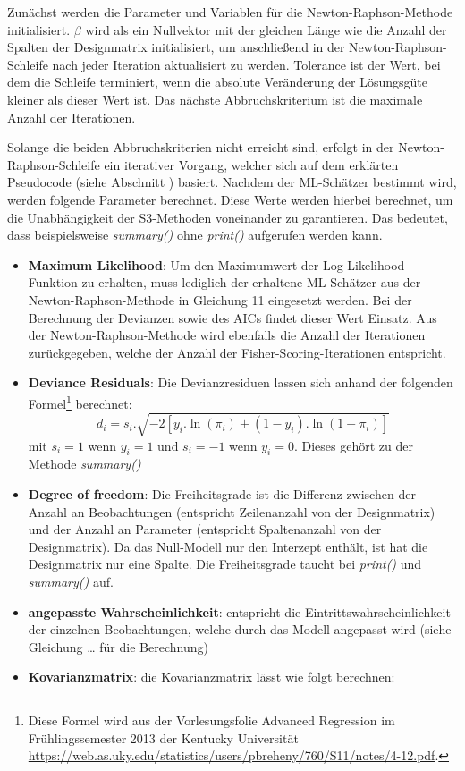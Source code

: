 \documentclass[12pt,]{article}
\let\rmarkdownfootnote\footnote%
\def\footnote{\protect\rmarkdownfootnote}
\begin{document}
Zunächst werden die Parameter und Variablen für die
Newton-Raphson-Methode initialisiert. \(\beta\) wird als ein Nullvektor
mit der gleichen Länge wie die Anzahl der Spalten der Designmatrix
initialisiert, um anschließend in der Newton-Raphson-Schleife nach jeder
Iteration aktualisiert zu werden. Tolerance ist der Wert, bei dem die
Schleife terminiert, wenn die absolute Veränderung der Lösungsgüte
kleiner als dieser Wert ist. Das nächste Abbruchskriterium ist die
maximale Anzahl der Iterationen.

Solange die beiden Abbruchskriterien nicht erreicht sind, erfolgt in der
Newton-Raphson-Schleife ein iterativer Vorgang, welcher sich auf dem
erklärten Pseudocode (siehe Abschnitt ) basiert. Nachdem der ML-Schätzer
bestimmt wird, werden folgende Parameter berechnet. Diese Werte werden
hierbei berechnet, um die Unabhängigkeit der S3-Methoden voneinander zu
garantieren. Das bedeutet, dass beispielsweise \emph{summary()} ohne
\emph{print()} aufgerufen werden kann.

\begin{itemize}
\item
  \textbf{Maximum Likelihood}: Um den Maximumwert der
  Log-Likelihood-Funktion zu erhalten, muss lediglich der erhaltene
  ML-Schätzer aus der Newton-Raphson-Methode in Gleichung 11 eingesetzt
  werden. Bei der Berechnung der Devianzen sowie des AICs findet dieser
  Wert Einsatz. Aus der Newton-Raphson-Methode wird ebenfalls die Anzahl
  der Iterationen zurückgegeben, welche der Anzahl der
  Fisher-Scoring-Iterationen entspricht.
\item
  \textbf{Deviance Residuals}: Die Devianzresiduen lassen sich anhand
  der folgenden Formel\footnote{Diese Formel wird aus der
    Vorlesungsfolie Advanced Regression im Frühlingssemester 2013 der
    Kentucky Universität
    \url{https://web.as.uky.edu/statistics/users/pbreheny/760/S11/notes/4-12.pdf}.}
  berechnet: \[
  d_i = s_i.\sqrt{-2[y_i.\ln(\pi_i) + (1 - y_i).\ln(1 - \pi_i)]}
  \] mit \(s_i = 1\) wenn \(y_i = 1\) und \(s_i = -1\) wenn \(y_i = 0\).
  Dieses gehört zu der Methode \emph{summary()}
\end{itemize}

\begin{itemize}
\item
  \textbf{Degree of freedom}: Die Freiheitsgrade ist die Differenz
  zwischen der Anzahl an Beobachtungen (entspricht Zeilenanzahl von der
  Designmatrix) und der Anzahl an Parameter (entspricht Spaltenanzahl
  von der Designmatrix). Da das Null-Modell nur den Interzept enthält,
  ist hat die Designmatrix nur eine Spalte. Die Freiheitsgrade taucht
  bei \emph{print()} und \emph{summary()} auf.
\item
  \textbf{angepasste Wahrscheinlichkeit}: entspricht die
  Eintrittswahrscheinlichkeit der einzelnen Beobachtungen, welche durch
  das Modell angepasst wird (siehe Gleichung \ldots{} für die
  Berechnung)
\item
  \textbf{Kovarianzmatrix}: die Kovarianzmatrix lässt wie folgt
  berechnen:
\end{itemize}
\end{document}

